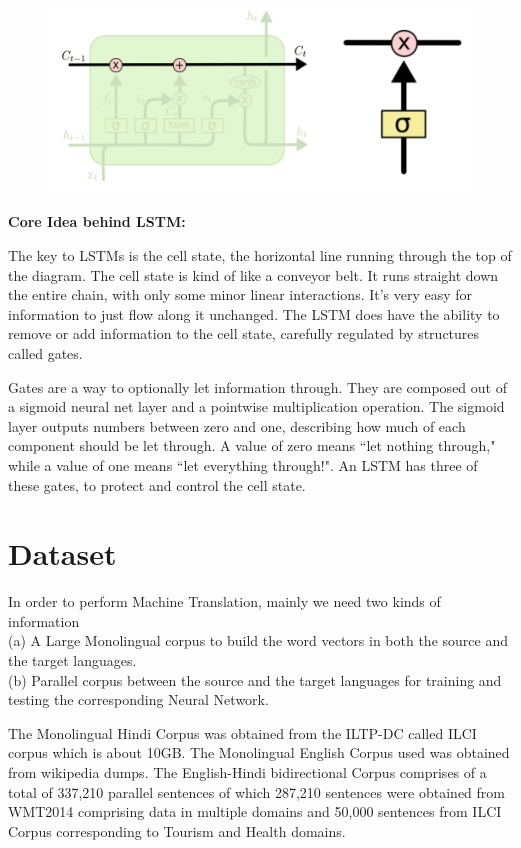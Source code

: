 \documentclass[12pt]{report}
\begin{document}
\begin{figure}[!hbt]
\centering
\includegraphics[width=5in]{lstm4.png}
\label{lstm4}
\end{figure}

\textbf{Core Idea behind LSTM:}

The key to LSTMs is the cell state, the horizontal line running through the top of the diagram. The cell state is kind of like a conveyor belt. It runs straight down the entire chain, with only some minor linear interactions. It’s very easy for information to just flow along it unchanged. The LSTM does have the ability to remove or add information to the cell state, carefully regulated by structures called gates.

Gates are a way to optionally let information through. They are composed out of a sigmoid neural net layer and a pointwise multiplication operation. The sigmoid layer outputs numbers between zero and one, describing how much of each component should be let through. A value of zero means ``let nothing through," while a value of one means ``let everything through!". An LSTM has three of these gates, to protect and control the cell state.




\chapter {Dataset} 
 
 In order to perform Machine Translation, mainly we need two kinds of information\\
 (a) A Large Monolingual corpus to build the word vectors in both the source and the target languages.\\
(b) Parallel corpus between the source and the target languages for training and testing the corresponding Neural Network.

The Monolingual Hindi Corpus was obtained from the ILTP-DC called ILCI corpus which is about 10GB. The Monolingual English Corpus used was obtained from wikipedia dumps. The English-Hindi bidirectional Corpus comprises of a total of 337,210 parallel sentences of which 287,210 sentences were obtained from WMT2014 comprising data in multiple domains and 50,000 sentences from ILCI Corpus corresponding to Tourism and Health domains.
\end{document}
